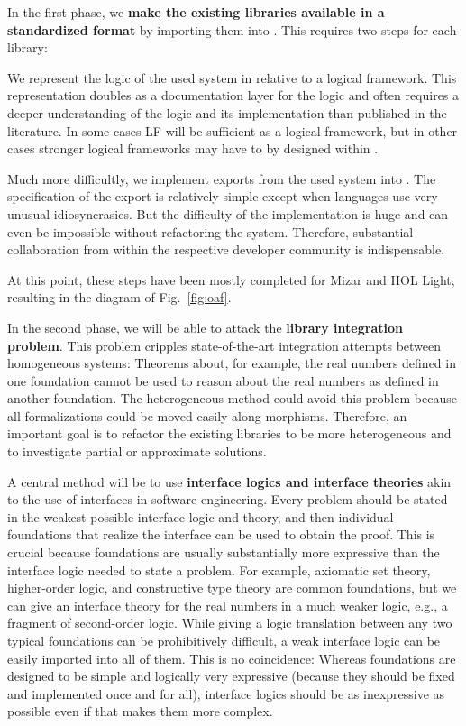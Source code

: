 In the first phase, we \textbf{make the existing libraries available in a standardized format} by importing them into \mmt.
This requires two steps for each library:
\begin{compactenum}
\item We represent the logic of the used system in \mmt relative to a logical framework.
This representation doubles as a documentation layer for the logic and often requires a deeper understanding of the logic and its implementation than published in the literature.
In some cases LF will be sufficient as a logical framework, but in other cases stronger logical frameworks may have to by designed within \mmt.
\item Much more difficultly, we implement exports from the used system into \mmt.
The specification of the export is relatively simple except when languages use very unusual idiosyncrasies.
But the difficulty of the implementation is huge and can even be impossible without refactoring the system.
Therefore, substantial collaboration from within the respective developer community is indispensable.
\end{compactenum}
At this point, these steps have been mostly completed for Mizar and HOL Light, resulting in the \mmt diagram of Fig.~\ref{fig:oaf}.
\medskip

In the second phase, we will be able to attack the \textbf{library integration problem}.
This problem cripples state-of-the-art integration attempts between homogeneous systems: Theorems about, for example, the real numbers defined in one foundation cannot be used to reason about the real numbers as defined in another foundation.
The heterogeneous method could avoid this problem because all formalizations could be moved easily along morphisms.
Therefore, an important goal is to refactor the existing libraries to be more heterogeneous and to investigate partial or approximate solutions.

A central method will be to use \textbf{interface logics and interface theories} akin to the use of interfaces in software engineering.
Every problem should be stated in the weakest possible interface logic and theory, and then individual foundations that realize the interface can be used to obtain the proof.
This is crucial because foundations are usually substantially more expressive than the interface logic needed to state a problem.
For example, axiomatic set theory, higher-order logic, and constructive type theory are common foundations, but we can give an interface theory for the real numbers in a much weaker logic, e.g., a fragment of second-order logic.
While giving a logic translation between any two typical foundations can be prohibitively difficult, a weak interface logic can be easily imported into all of them.
This is no coincidence: Whereas foundations are designed to be simple and logically very expressive (because they should be fixed and implemented once and for all), interface logics should be as inexpressive as possible even if that makes them more complex.

